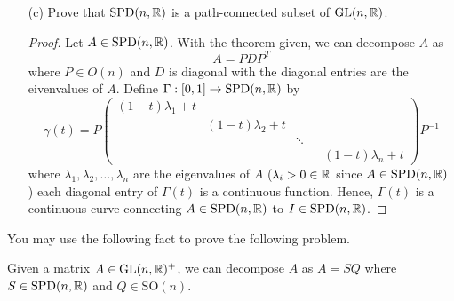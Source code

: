 \documentclass{article}
\begin{document}
\begin{enumerate}
\begin{proof}
            \begin{align*}
                AB  &= \begin{pmatrix} 1 & 2 \\ 2 & 5  \end{pmatrix} \begin{pmatrix} 1 & -1 \\ -1 & 2  \end{pmatrix}  \\
                    &= \begin{pmatrix} - 1 & 3 \\ -3 & 8  \end{pmatrix}.
            \end{align*}
        Notice that \( \text{det}(AB) < 0 \) and \( AB \) is clearly not symmetric. Hence, \( AB \notin \text{SPD}(n,\R)  \) and so \( \text{SPD}(n,\R)  \) is not closed under matrix multiplication. 
        \end{proof}
    \item[(c)] Prove that \( \text{SPD}(n,\R)  \) is a path-connected subset of \( \text{GL}(n,\mathbb{R})  \).
        \begin{proof}
        Let \( A \in \text{SPD}(n,\mathbb{R})  \). With the theorem given, we can decompose \( A  \) as 
        \[  A = P D P^{T} \]
        where \( P \in O(n) \) and \( D  \) is diagonal with the diagonal entries are the eivenvalues of \( A  \). Define \( \Gamma: [0,1] \to \text{SPD}(n,\mathbb{R})  \) by
        \[  \gamma(t) = P \begin{pmatrix} (1-t){\lambda}_{1} + t &  & \\ & (1-t){\lambda}_{2} + t  & &  \\  & & \ddots  &  \\ & & & & (1-t){\lambda}_{n} + t  \end{pmatrix} P^{-1} \tag{\( \forall t \in [0,1] \)}  \]
        where \( {\lambda}_{1}, {\lambda}_{2}, \dots, {\lambda}_{n}  \) are the eigenvalues of \( A  \) (\( {\lambda}_{i} > 0 \in \mathbb{R} \) since \( A \in \text{SPD}(n,\mathbb{R})  \) ) each diagonal entry of \( \Gamma(t) \) is a continuous function. Hence, \( \Gamma(t) \) is a continuous curve connecting \( A \in \text{SPD}(n,\mathbb{R})  \) to \( I \in \text{SPD}(n,\mathbb{R})  \). 
        \end{proof}
\end{enumerate}

You may use the following fact to prove the following problem.

\begin{theorem}[ ]
    Given a matrix \( A \in \text{GL}(n,\mathbb{R})^{+}   \), we can decompose \( A  \) as \( A = SQ  \) where \( S \in \text{SPD}(n,\mathbb{R})     \) and \( Q \in \text{SO}(n)  \).
\end{theorem}
\end{document}
